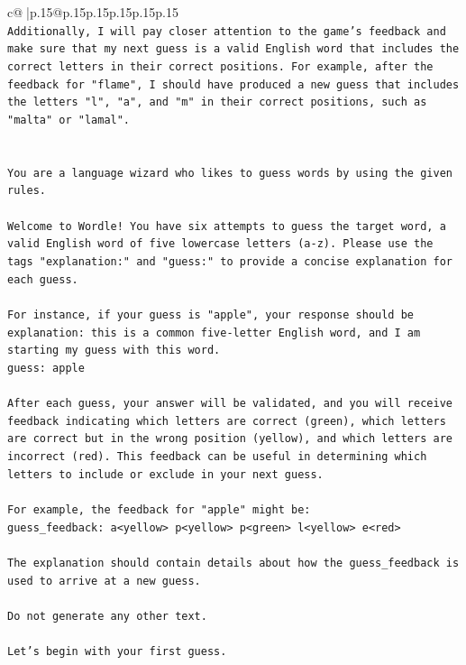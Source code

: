 \documentclass{article}
\begin{document}
{\begin{supertabular}{c@{$\;$}|p{.15\linewidth}@{}p{.15\linewidth}p{.15\linewidth}p{.15\linewidth}p{.15\linewidth}p{.15\linewidth}}
{{{\\ 
\texttt{Additionally, I will pay closer attention to the game's feedback and make sure that my next guess is a valid English word that includes the correct letters in their correct positions. For example, after the feedback for "flame", I should have produced a new guess that includes the letters "l", "a", and "m" in their correct positions, such as "malta" or "lamal".} \\
\\ 
\\ 
\texttt{You are a language wizard who likes to guess words by using the given rules.} \\
\\ 
\texttt{Welcome to Wordle! You have six attempts to guess the target word, a valid English word of five lowercase letters (a{-}z). Please use the tags "explanation:" and "guess:" to provide a concise explanation for each guess.} \\
\\ 
\texttt{For instance, if your guess is "apple", your response should be} \\
\texttt{explanation: this is a common five{-}letter English word, and I am starting my guess with this word.} \\
\texttt{guess: apple} \\
\\ 
\texttt{After each guess, your answer will be validated, and you will receive feedback indicating which letters are correct (green), which letters are correct but in the wrong position (yellow), and which letters are incorrect (red). This feedback can be useful in determining which letters to include or exclude in your next guess.} \\
\\ 
\texttt{For example, the feedback for "apple" might be:} \\
\texttt{guess\_feedback: a<yellow> p<yellow> p<green> l<yellow> e<red>} \\
\\ 
\texttt{The explanation should contain details about how the guess\_feedback is used to arrive at a new guess.} \\
\\ 
\texttt{Do not generate any other text.} \\
\\ 
\texttt{Let's begin with your first guess.} \\
            }
        }
    }
     \\ \\


\end{supertabular}}
\end{document}
